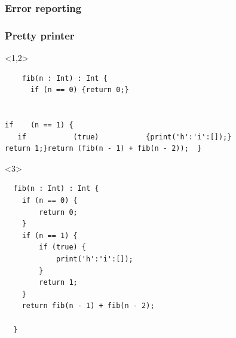 \documentclass{beamer}
\begin{document}

\begin{frame}
  \frametitle{Error reporting}
\end{frame}

\begin{frame}[fragile]
  \frametitle{Pretty printer}

  \begin{onlyenv}<1,2>
  \begin{verbatim}
    fib(n : Int) : Int {
      if (n == 0) {return 0;}


if    (n == 1) {
   if           (true)           {print('h':'i':[]);}
return 1;}return (fib(n - 1) + fib(n - 2));  }
    \end{verbatim}
  \end{onlyenv}

\begin{onlyenv}<3>
  \begin{verbatim}
  fib(n : Int) : Int {
    if (n == 0) {
        return 0;
    }
    if (n == 1) {
        if (true) {
            print('h':'i':[]);
        }
        return 1;
    }
    return fib(n - 1) + fib(n - 2);

  }
    \end{verbatim}
  \end{onlyenv}
\end{frame}
\end{document}
